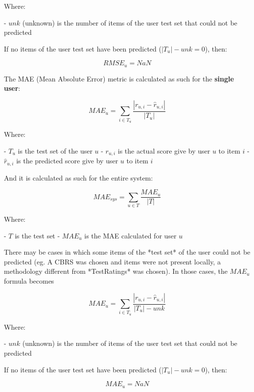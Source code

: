    Where:

    - $unk$ (unknown) is the number of items of the user test set that could not be predicted

    If no items of the user test set have been predicted ($|T_u| - unk = 0$), then:

    \[
    RMSE_u = NaN
    \]

\hfill\break



The MAE (Mean Absolute Error) metric is calculated as such for the \textbf{single user}:

    \[
    MAE_u = \sum_{i \in T_u} \frac{|r_{u,i} - \hat{r}_{u,i}|}{|T_u|}
    \]

    Where:

    - $T_u$ is the test set of the user $u$
    - $r_{u, i}$ is the actual score give by user $u$ to item $i$
    - $\hat{r}_{u, i}$ is the predicted score give by user $u$ to item $i$

\hfill\break

And it is calculated as such for the entire system:

    \[
    MAE_{sys} = \sum_{u \in T} \frac{MAE_u}{|T|}
    \]

    Where:

    - $T$ is the test set
    - $MAE_u$ is the MAE calculated for user $u$

\hfill\break

There may be cases in which some items of the *test set* of the user could not be predicted (eg. A CBRS was chosen
and items were not present locally, a methodology different from *TestRatings* was chosen).
In those cases, the $MAE_u$ formula becomes

    \[
    MAE_u = \sum_{i \in T_u} \frac{|r_{u,i} - \hat{r}_{u,i}|}{|T_u| - unk}
    \]

    Where:

    - $unk$ (unknown) is the number of items of the user test set that could not be predicted

    If no items of the user test set have been predicted ($|T_u| - unk = 0$), then:

    \[
    MAE_u = NaN
    \]

\hfill\break




